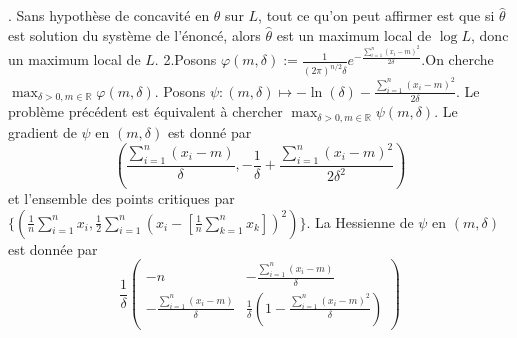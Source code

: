 \documentclass{report}
\begin{document}
\subsection{} \noindent{}\\ 
\\ 
\\
. Sans hypothèse de concavité en $\theta$ sur $L$, tout ce qu'on peut affirmer est que si $\hat \theta$ est solution du système de l'énoncé, alors $\hat \theta$ est un maximum local de $\log L$, donc un maximum local de $L$.\newline
\newline
2.Posons $\varphi(m,\delta):=\frac{1}{(2\pi)^{n/2}\delta}e^{-\frac{\sum_{i=1}^n (x_i-m)^2}{2\delta}}$.\newline On cherche $\displaystyle \max_{\delta >0, m \in \mathbb R} \varphi(m,\delta)$. \newline
Posons $\psi:(m,\delta)\mapsto -\ln(\delta) - \frac{\sum_{i=1}^n(x_i-m)^2}{2\delta}$. Le problème précédent est équivalent à chercher $\max_{\delta >0, m \in \mathbb R} \psi(m,\delta)$.\newline
Le gradient de $\psi$ en $(m,\delta)$ est donné par $$\left(\frac{\sum_{i=1}^n (x_i-m)}{\delta}, -\frac{1}{\delta} + \frac{\sum_{i=1}^n (x_i-m)^2}{2\delta^2}  \right)$$ et l'ensemble des points critiques par $\{(\frac{1}{n}\sum_{i=1}^n x_i, \frac{1}{2}\sum_{i=1}^n \left(x_i - \left[\frac{1}{n}\sum_{k=1}^n x_k \right]\right)^2)\}$. \newline
La Hessienne de $\psi$ en $(m,\delta)$ est donnée par $$\frac{1}{\delta}\begin{pmatrix}
-n & -\frac{\sum_{i=1}^n (x_i-m)}{\delta} \\
-\frac{\sum_{i=1}^n (x_i-m)}{\delta} & \frac{1}{\delta} \left(1-\frac{\sum_{i=1}^n (x_i-m)^2}{\delta} \right)
\end{pmatrix}$$
\end{document}
